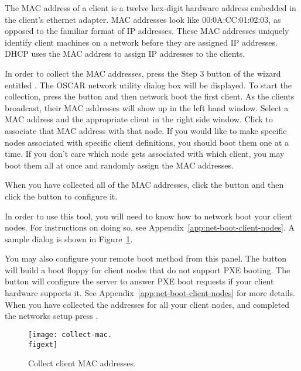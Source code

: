 The MAC address of a client
is a twelve hex-digit hardware address embedded in the client's
ethernet adapter. MAC addresses look like 00:0A:CC:01:02:03, as
opposed to the familiar format of IP addresses. These MAC addresses
uniquely identify client machines on a network before they are
assigned IP addresses. DHCP uses the MAC address to assign IP 
addresses to the clients.

In order to collect the MAC addresses,  press the Step 3 button
  of the wizard entitled . The
  OSCAR network utility dialog box will be displayed.
  To start the collection, press the  button and then
  network boot the first client.  As the clients broadcast, their MAC addresses
  will show up in the left hand window. Select a MAC address and the appropriate
  client in the right side window. Click  to 
  associate that MAC address with that node. If you would like to make 
  specific nodes associated with specific client definitions, you should
  boot them one at a time. If you don't care which node gets associated
  with which client, you may boot them all at once and randomly assign
  the MAC addresses.

  When you have collected all of the MAC addresses, click the 
  button and then click the  button to configure it.

  In order to use this tool, you will need to know
  how to network boot your client nodes.  For instructions on doing
  so, see Appendix~\ref{app:net-boot-client-nodes}. A sample dialog
  is shown in Figure~\ref{fig:detailed-collect-mac}. 
 
  You may also configure your remote boot method from this panel. The
   button will build a boot floppy for
  client nodes that do not support PXE booting. The  button will configure the server to answer PXE boot requests if
  your client hardware supports it. See Appendix~\ref{app:net-boot-client-nodes}
  for more details.
  When you have collected the
  addresses for all your client nodes, and completed the networks setup
  press .

\begin{figure}[htbp]
  \begin{center}
    \texttt{[image: collect-mac.\\figext]}
    \caption{Collect client MAC addresses.}
    \label{fig:detailed-collect-mac}
  \end{center}
\end{figure}

